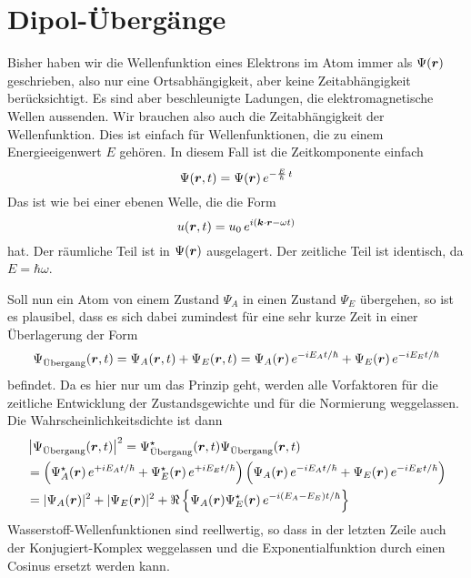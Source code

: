 \section{Dipol-Übergänge}

Bisher haben wir die Wellenfunktion eines Elektrons im Atom immer als $\Psi(\boldsymbol{r})$ geschrieben, also nur eine Ortsabhängigkeit, aber keine Zeitabhängigkeit berücksichtigt. Es sind aber beschleunigte Ladungen, die elektromagnetische Wellen aussenden. Wir brauchen also auch die Zeitabhängigkeit der Wellenfunktion. Dies ist einfach für Wellenfunktionen, die zu einem Energieeigenwert $E$ gehören. In diesem Fall ist die Zeitkomponente einfach 
\begin{equation}
    \Psi(\boldsymbol{r}, t) = \Psi(\boldsymbol{r}) \, e^{- \frac{E}{\hbar} \, t}
\end{equation}
Das ist wie bei einer ebenen Welle, die die Form 
\begin{equation}
    u(\boldsymbol{r}, t) = u_0 \, e^{i ( \boldsymbol{k} \cdot \boldsymbol{r} - \omega t)}
\end{equation}
hat. Der räumliche Teil ist in $\Psi(\boldsymbol{r})$ ausgelagert. Der zeitliche Teil ist identisch, da $E = \hbar \omega$.

Soll nun ein Atom von einem Zustand $\Psi_A$ in einen Zustand $\Psi_E$ übergehen, so ist es plausibel, dass es sich dabei zumindest für eine sehr kurze Zeit in einer Überlagerung der Form 
\begin{equation}
    \Psi_\text{Übergang} (\boldsymbol{r}, t) = \Psi_A(\boldsymbol{r}, t) + \Psi_E(\boldsymbol{r}, t) = 
    \Psi_A(\boldsymbol{r}) \, e^{-i E_A t / \hbar} +  \Psi_E(\boldsymbol{r}) \, e^{-i E_E t / \hbar}
\end{equation}
befindet. Da es hier nur um das Prinzip geht, werden alle Vorfaktoren für die zeitliche Entwicklung der Zustandsgewichte und für die Normierung weggelassen. Die Wahrscheinlichkeitsdichte ist dann
\begin{align}
    & \left| \Psi_\text{Übergang} (\boldsymbol{r}, t)  \right|^2 =  \Psi_\text{Übergang}^\star (\boldsymbol{r}, t) \Psi_\text{Übergang} (\boldsymbol{r}, t)  \\
   & =  \left(  \Psi_A^\star(\boldsymbol{r}) \, e^{+i E_A t / \hbar} +  \Psi_E^\star(\boldsymbol{r}) \, e^{+i E_E t / \hbar} \right)
    \left(  \Psi_A(\boldsymbol{r}) \, e^{-i E_A t / \hbar} +  \Psi_E(\boldsymbol{r}) \, e^{-i E_E t / \hbar} \right) \\
    & = | \Psi_A(\boldsymbol{r})|^2 + | \Psi_E(\boldsymbol{r})|^2  +\Re \left\{ \Psi_A(\boldsymbol{r})\Psi_E^\star(\boldsymbol{r})  \, e^{-i (E_A - E_E) t / \hbar}  \right\} 
\end{align}
Wasserstoff-Wellenfunktionen sind reellwertig, so dass in der letzten Zeile auch der Konjugiert-Komplex weggelassen und die Exponentialfunktion durch einen Cosinus ersetzt werden kann.

